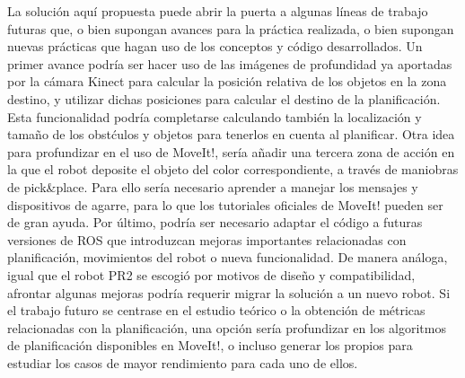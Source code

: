 \documentclass[12pt,spanish,chapterprefix, numbers=noenddot]{book}
\numberwithin{equation}{section}
\numberwithin{figure}{section}
\begin{document}
La solución aquí propuesta puede abrir la puerta a algunas líneas de trabajo futuras que, o bien supongan avances para la práctica realizada, o bien supongan nuevas prácticas que hagan uso de los conceptos y código desarrollados. 
Un primer avance podría ser hacer uso de las imágenes de profundidad ya aportadas por la cámara Kinect para calcular la posición relativa de los objetos en la zona destino, y utilizar dichas posiciones para calcular el destino de la planificación. Esta funcionalidad podría completarse calculando también la localización y tamaño de los obstćulos y objetos para tenerlos en cuenta al planificar. 
Otra idea para profundizar en el uso de MoveIt!, sería añadir una tercera zona de acción en la que el robot deposite el objeto del color correspondiente, a través de maniobras de pick\&place. Para ello sería necesario aprender a manejar los mensajes y dispositivos de agarre, para lo que los tutoriales oficiales de MoveIt! pueden ser de gran ayuda. 
Por último, podría ser necesario adaptar el código a futuras versiones de ROS que introduzcan mejoras importantes relacionadas con planificación, movimientos del robot o nueva funcionalidad. De manera análoga, igual que el robot PR2 se escogió por motivos de diseño y compatibilidad, afrontar algunas mejoras podría requerir migrar la solución a un nuevo robot. 
Si el trabajo futuro se centrase en el estudio teórico o la obtención de métricas relacionadas con la planificación, una opción sería profundizar en los algoritmos de planificación disponibles en MoveIt!, o incluso generar los propios para estudiar los casos de mayor rendimiento para cada uno de ellos. 

\printbibliography[heading=bibintoc]
\printindex
\end{document}
